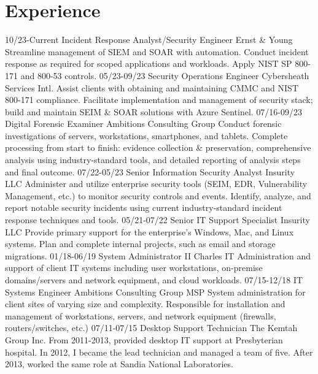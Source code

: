 \documentclass[]{twentysecondcv}
\begin{document}
\section{Experience}
\begin{twenty}
  \twentyitem
  {10/23-Current}
  {Incident Response Analyst\slash Security Engineer}
  {Ernst \& Young}
  {Streamline management of SIEM and SOAR with automation. Conduct incident response
    as required for scoped applications and workloads. Apply NIST SP 800-171 and
    800-53 controls.}
  \twentyitem
  {05/23-09/23}
  {Security Operations Engineer}
  {Cybersheath Services Intl.}
  {Assist clients with obtaining and maintaining CMMC and NIST 800-171 compliance.
    Facilitate implementation and management of security stack; build and maintain
    SEIM \& SOAR solutions with Azure Sentinel.}
  \twentyitem
  {07/16-09/23}
  {Digital Forensic Examiner}
  {Ambitions Consulting Group}
  {Conduct forensic investigations of servers, workstations, smartphones, and
    tablets. Complete processing from start to finish: evidence collection \& preservation,
    comprehensive analysis using industry-standard tools, and detailed reporting of
    analysis steps and final outcome.}
  \twentyitem
  {07/22-05/23}
  {Senior Information Security Analyst}
  {Insurity LLC}
  {Administer and utilize enterprise security tools (SEIM, EDR, Vulnerability
    Management, etc.) to monitor security controls and events. Identify, analyze,
    and report notable security incidents using current industry-standard incident
    response techniques and tools.}
  \twentyitem
  {05/21-07/22}
  {Senior IT Support Specialist}
  {Insurity LLC}
  {Provide primary support for the enterprise's Windows, Mac, and Linux systems.
    Plan and complete internal projects, such as email and storage migrations.}
  \twentyitem
  {01/18-06/19}
  {System Administrator II}
  {Charles IT}
  {Administration and support of client IT systems including  user workstations,
    on-premise domains\slash servers and network equipment, and cloud workloads.}
  \twentyitem
  {07/15-12/18}
  {IT Systems Engineer}
  {Ambitions Consulting Group}
  {MSP System administration for client sites of varying size and complexity. Responsible
    for installation and management of workstations, servers, and network equipment
    (firewalls, routers/switches, etc.)}
  \twentyitem
  {07/11-07/15}
  {Desktop Support Technician}
  {The Kemtah Group Inc.}
  {From 2011-2013, provided desktop IT support at Presbyterian hospital. In 2012,
    I became the lead technician and managed a team of five. After 2013, worked the
    same role at Sandia National Laboratories.}

\end{twenty}
\end{document}
